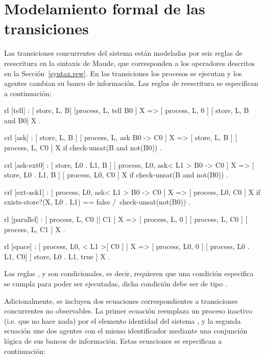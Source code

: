 \section{Modelamiento formal de las transiciones}
\label{rules.rew}

Las transiciones concurrentes del sistema est\'an modeladas por seis reglas de reescritura en la sintaxis de Maude, que corresponden a los operadores descritos en la Secci\'on~\ref{syntax.rew}. En las transiciones los procesos se ejecutan y los agentes cambian su banco de informaci\'on. Las reglas de reescritura se especifican a continuaci\'on: 

\begin{maude}
  rl [tell] :
     { [ store, L, B] [process, L, tell B0 ] X }
  => { [ process, L, 0 ] [ store, L, B and B0] X } .

 crl [ask] :
     { [ store, L, B ] [ process, L, ask B0  -> C0 ] X }
  => { [ store, L, B ] [ process, L, C0 ] X }
  if check-unsat(B and not(B0)) .

 crl [ask-ext0] :
     { [ store, L0 . L1, B ] 
       [ process, L0, ask< L1 > B0  -> C0 ] X }
  => { [ store, L0 . L1, B ] [ process, L0, C0 ] X }
  if check-unsat(B and not(B0)) . 

 crl [ext-ask1] :
     { [ process, L0, ask< L1 > B0  -> C0 ] X }
  => { [ process, L0, C0 ] X }
  if exists-store?(X, L0 . L1) == false
  /\ check-unsat(not(B0)) . 

  rl [parallel] :
     { [ process, L, C0 || C1 ] X }
  => { [ process, L, 0 ] [ process, L, C0 ] 
       [ process, L, C1 ] X } .

  rl [space] :
     { [ process, L0, < L1 >[ C0 ] ] X } 
  => { [ process, L0, 0 ] [ process, L0 . L1, C0] 
       [ store, L0 . L1, true ] X } .
\end{maude}

Las reglas \cde{[ask]},  y  son condicionales, es decir, requieren que una condici\'on especifica se cumpla para poder ser ejecutadas, dicha condici\'on debe ser de tipo .

Adicionalmente, se incluyen dos ecuaciones correspondientes a transiciones concurrentes no observables. La primer ecuaci\'on reemplaza un proceso inactivo (i.e. que no hace nada) por el elemento identidad del sistema , y la segunda ecuaci\'on une dos agentes con el mismo identificador mediante una conjunci\'on l\'ogica de sus bancos de informaci\'on. Estas ecuaciones se especifican a continuaci\'on:

